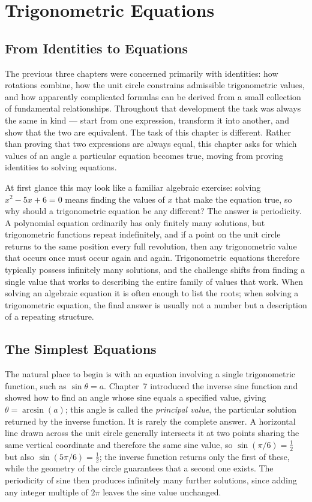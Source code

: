 \chapter{Trigonometric Equations}
\label{ch:ch11-equations}

\section{From Identities to Equations}

The previous three chapters were concerned primarily with identities: how
rotations combine, how the unit circle constrains admissible trigonometric
values, and how apparently complicated formulas can be derived from a
small collection of fundamental relationships. Throughout that development
the task was always the same in kind --- start from one expression,
transform it into another, and show that the two are equivalent. The task
of this chapter is different. Rather than proving that two expressions are
always equal, this chapter asks for which values of an angle a particular
equation becomes true, moving from proving identities to solving equations.

At first glance this may look like a familiar algebraic exercise: solving
$x^2 - 5x + 6 = 0$ means finding the values of $x$ that make the equation
true, so why should a trigonometric equation be any different? The answer
is periodicity. A polynomial equation ordinarily has only finitely many
solutions, but trigonometric functions repeat indefinitely, and if a point
on the unit circle returns to the same position every full revolution,
then any trigonometric value that occurs once must occur again and again.
Trigonometric equations therefore typically possess infinitely many
solutions, and the challenge shifts from finding a single value that works
to describing the entire family of values that work. When solving an
algebraic equation it is often enough to list the roots; when solving a
trigonometric equation, the final answer is usually not a number but a
description of a repeating structure.

\section{The Simplest Equations}

The natural place to begin is with an equation involving a single
trigonometric function, such as $\sin\theta = a$. Chapter~7 introduced the
inverse sine function and showed how to find an angle whose sine equals a
specified value, giving $\theta = \arcsin(a)$; this angle is called the
\emph{principal value}, the particular solution returned by the inverse
function. It is rarely the complete answer. A horizontal line drawn across
the unit circle generally intersects it at two points sharing the same
vertical coordinate and therefore the same sine value, so
$\sin(\pi/6) = \tfrac12$ but also $\sin(5\pi/6) = \tfrac12$; the inverse
function returns only the first of these, while the geometry of the circle
guarantees that a second one exists. The periodicity of sine then produces
infinitely many further solutions, since adding any integer multiple of
$2\pi$ leaves the sine value unchanged.

